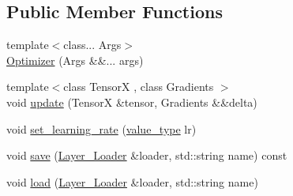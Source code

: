 \subsection*{Public Member Functions}
\begin{DoxyCompactItemize}
\item 
{\footnotesize template$<$class... Args$>$ }\\\hyperlink{structbc_1_1nn_1_1Adam_1_1Optimizer_a726192bbb8742fb5b00a7e0107754c14}{Optimizer} (Args \&\&... args)
\item 
{\footnotesize template$<$class TensorX , class Gradients $>$ }\\void \hyperlink{structbc_1_1nn_1_1Adam_1_1Optimizer_a6f24191f989e2ee969535ef87c47ac8c}{update} (TensorX \&tensor, Gradients \&\&delta)
\item 
void \hyperlink{structbc_1_1nn_1_1Adam_1_1Optimizer_a1e31083035a2408d089428cdf48b318c}{set\+\_\+learning\+\_\+rate} (\hyperlink{structbc_1_1nn_1_1Adam_1_1Optimizer_a6c0f45fad49cbec9368339576806cb75}{value\+\_\+type} lr)
\item 
void \hyperlink{structbc_1_1nn_1_1Adam_1_1Optimizer_ae205dfb8c1c21f0885660fcafeeaa4b8}{save} (\hyperlink{structbc_1_1nn_1_1Layer__Loader}{Layer\+\_\+\+Loader} \&loader, std\+::string name) const
\item 
void \hyperlink{structbc_1_1nn_1_1Adam_1_1Optimizer_a6f2a8ae5cbfc888476d90b1edc44d0d8}{load} (\hyperlink{structbc_1_1nn_1_1Layer__Loader}{Layer\+\_\+\+Loader} \&loader, std\+::string name)
\end{DoxyCompactItemize}
